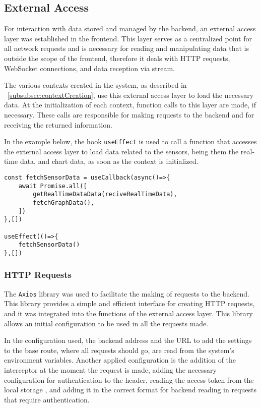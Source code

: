 \subsection{External Access}\label{subsec:api_access}
For interaction with data stored and managed by the backend, an external access layer was established in the frontend. This layer serves as a centralized point for all network requests and is necessary for reading and manipulating data that is outside the scope of the frontend, therefore it deals with HTTP requests, WebSocket connections, and data reception via stream.

The various contexts created in the system, as described in ~\ref{subsubsec:contextCreation}, use this external access layer to load the necessary data. At the initialization of each context, function calls to this layer are made, if necessary. These calls are responsible for making requests to the backend and for receiving the returned information.

In the example below, the hook \texttt{useEffect} \cite{reactUseEffect} is used to call a function that accesses the external access layer to load data related to the sensors, being them the real-time data, and chart data, as soon as the context is initialized.

\begin{verbatim}
const fetchSensorData = useCallback(async()=>{
    await Promise.all([
        getRealTimeDataData(reciveRealTimeData),
        fetchGraphData(),
    ])
},[])

useEffect(()=>{
    fetchSensorData()
},[])
\end{verbatim}


\subsubsection{HTTP Requests}\label{subsubsec:httpRequest}
The \texttt{Axios} library \cite{axiosIntro} was used to facilitate the making of requests to the backend. This library provides a simple and efficient interface for creating \gls{HTTP} requests, and it was integrated into the functions of the external access layer. This library allows an initial configuration to be used in all the requests made.

In the configuration used, the backend address and the URL to add the settings to the base route, where all requests should go, are read from the system's environment variables. Another applied configuration is the addition of the interceptor \cite{axiosInterceptors} at the moment the request is made, adding the necessary configuration for authentication to the header, reading the access token from the local storage \cite{mdnLocalStorage}, and adding it in the correct format for backend reading in requests that require authentication.

